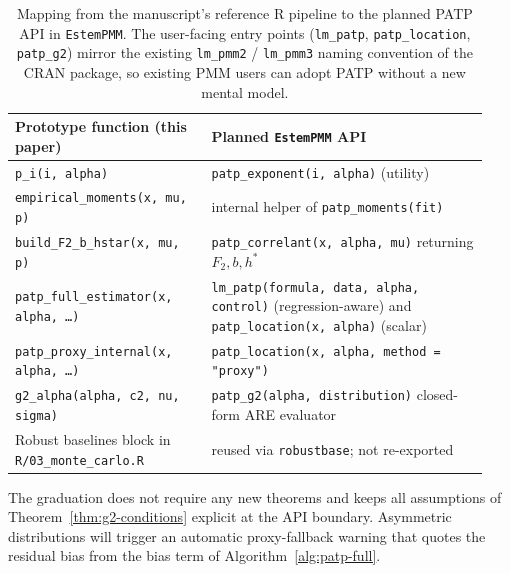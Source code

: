 \documentclass[11pt]{article}
\def\mathbf#1{#1}%
\theoremstyle{definition}
\begin{document}
\begin{table}[!htb]
\centering
\small
\setlength{\tabcolsep}{3pt}
\begin{tabular}{p{0.39\linewidth}p{0.55\linewidth}}
\hline
Prototype function (this paper) & Planned \texttt{EstemPMM} API \\
\hline
\texttt{p\_i(i, alpha)}
  & \texttt{patp\_exponent(i, alpha)} (utility) \\
\texttt{empirical\_moments(x, mu, p)}
  & internal helper of \texttt{patp\_moments(fit)} \\
\texttt{build\_F2\_b\_hstar(x, mu, p)}
  & \texttt{patp\_correlant(x, alpha, mu)} returning $\mathbf{F}_2,\mathbf{b},\mathbf{h}^{*}$ \\
\texttt{patp\_full\_estimator(x, alpha, \ldots)}
  & \texttt{lm\_patp(formula, data, alpha, control)} (regression-aware)
    and \texttt{patp\_location(x, alpha)} (scalar) \\
\texttt{patp\_proxy\_internal(x, alpha, \ldots)}
  & \texttt{patp\_location(x, alpha, method = "proxy")} \\
\texttt{g2\_alpha(alpha, c2, nu, sigma)}
  & \texttt{patp\_g2(alpha, distribution)} closed-form ARE evaluator \\
Robust baselines block in \texttt{R/03\_monte\_carlo.R}
  & reused via \texttt{robustbase}; not re-exported \\
\hline
\end{tabular}
\caption{Mapping from the manuscript's reference R pipeline to the
planned PATP API in \texttt{EstemPMM}. The user-facing entry points
(\texttt{lm\_patp}, \texttt{patp\_location}, \texttt{patp\_g2}) mirror
the existing \texttt{lm\_pmm2} / \texttt{lm\_pmm3} naming convention of
the CRAN package, so existing PMM users can adopt PATP without a new
mental model.}
\label{tab:estempmm-roadmap}
\end{table}

The graduation does not require any new theorems and keeps all assumptions
of Theorem~\ref{thm:g2-conditions} explicit at the API boundary.
Asymmetric distributions will trigger an automatic proxy-fallback warning
that quotes the residual bias from the bias term of
Algorithm~\ref{alg:patp-full}.



\end{document}
